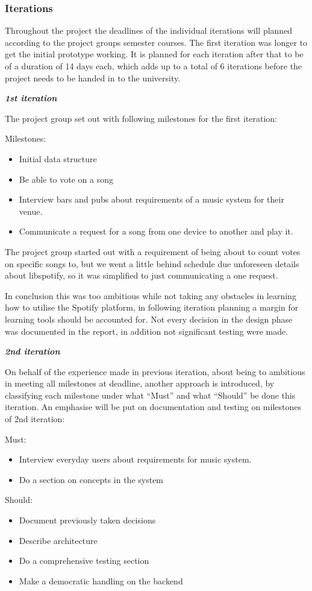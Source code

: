 \subsubsection{Iterations}

Throughout the project the deadlines of the individual iterations will planned according to the project groups semester courses. The first iteration was longer to get the initial prototype working. It is planned for each iteration after that to be of a duration of 14 days each, which adds up to a total of 6 iterations before the project needs to be handed in to the university.

\textit{\textbf{1st iteration}}

	The project group set out with following milestones for the first iteration:

	Milestones:
	\begin{itemize}
		\item Initial data structure
		\item Be able to vote on a song
		\item Interview bars and pubs about requirements of a music system for their venue.
		\item Communicate a request for a song from one device to another and play it.
	\end{itemize}

	The project group started out with a requirement of being about to count votes on specific songs to, but we went a little behind schedule due unforeseen details about libspotify, so it was simplified to just communicating a one request.

	In conclusion this was too ambitious while not taking any obstacles in learning how to utilise the Spotify platform, in following iteration planning a margin for learning tools should be accounted for. Not every decision in the design phase was documented in the report, in addition not significant testing were made.

\noindent\textit{\textbf{2nd iteration}}

	On behalf of the experience made in previous iteration, about being to ambitious in meeting all milestones at deadline, another approach is introduced, by classifying each milestone under what \enquote{Must} and what \enquote{Should} be done this iteration. An emphasise will be put on documentation and testing on milestones of 2nd iteration:

	Must:
	\begin{itemize}
		\item Interview everyday users about requirements for music system.
		\item Do a section on concepts in the system
	\end{itemize}

	Should:
	\begin{itemize}
		\item Document previously taken decisions
		\item Describe architecture
		\item Do a comprehensive testing section
		\item Make a democratic handling on the backend
	\end{itemize}